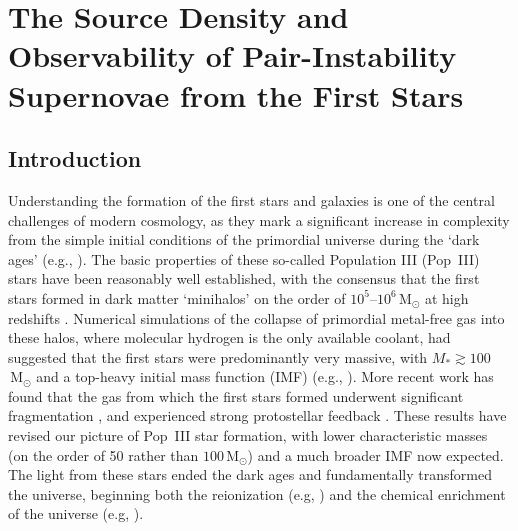 \documentclass{thesis}
\newcommand{\msun}{\ensuremath{\,\mathrm{M}_{\odot}}\xspace}
\begin{document}
\chapter{The Source Density and Observability of Pair-Instability Supernovae from the First Stars}

\section{Introduction}
Understanding the formation of the first stars and galaxies is one of
the central challenges of modern cosmology, as they mark a significant
increase in complexity from the simple initial conditions of the
primordial universe during the `dark ages' (e.g.,
\citealt{BarkanaLoeb2001, Miralda-Escude2003, Brommetal2009,
  Loeb2010}). The basic properties of these so-called Population III
(Pop~III) stars have been reasonably well established, with the
consensus that the first stars formed in dark matter `minihalos' on
the order of $10^5$--$10^6$\msun at high redshifts
\citep{CouchmanRees1986,HaimanThoulLoeb1996,Tegmarketal1997}.
Numerical simulations of the collapse of primordial metal-free gas
into these halos, where molecular hydrogen is the only available
coolant, had suggested that the first stars were predominantly very
massive, with $M_* \gtrsim100$\msun and a top-heavy initial mass
function (IMF) (e.g., \citealt{BrommCoppiLarson1999,
  BrommCoppiLarson2002, AbelBryanNorman2002, BrommLarson2004,
  Yoshidaetal2006, O'SheaNorman2007}).  More recent work has found
that the gas from which the first stars formed underwent significant
fragmentation \citep{StacyGreifBromm2010, Clarketal2011b,
  Greifetal2011, Greifetal2012}, and experienced strong protostellar
feedback \citep{Hosokawaetal2011, StacyGreifBromm2012}.  These results
have revised our picture of Pop~III star formation, with lower
characteristic masses (on the order of 50 rather than $100$\msun) and
a much broader IMF now expected.  The light from these stars ended the
dark ages and fundamentally transformed the universe, beginning both
the reionization (e.g, \citealt{Meiksin2009}) and the chemical
enrichment of the universe (e.g, \citealt{Karlsson2011}).
\end{document}
